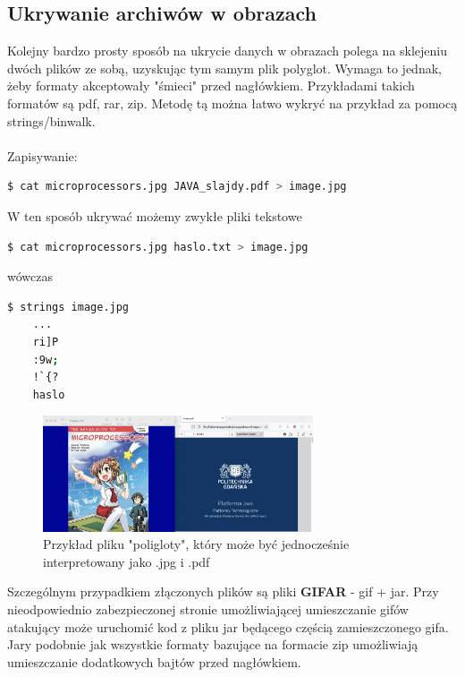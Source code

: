 \documentclass{article}
\begin{document}
\subsection{Ukrywanie archiwów w obrazach}
Kolejny bardzo prosty sposób na ukrycie danych w obrazach polega na sklejeniu dwóch plików ze sobą, uzyskując tym samym plik polyglot.  Wymaga to jednak, żeby formaty akceptowały "śmieci" przed nagłówkiem.  Przykładami takich
formatów są pdf, rar, zip.
Metodę tą można łatwo wykryć na przykład za pomocą strings/binwalk. \\\\
Zapisywanie:
\begin{lstlisting}[language=bash]
  $ cat microprocessors.jpg JAVA_slajdy.pdf > image.jpg
\end{lstlisting}
W ten sposób ukrywać możemy zwykłe pliki tekstowe
\begin{lstlisting}[language=bash]
  $ cat microprocessors.jpg haslo.txt > image.jpg
\end{lstlisting}
wówczas 
\begin{lstlisting}[language=bash]
 $ strings image.jpg
	...
 	ri]P
	:9w;
	!`{?
	haslo
\end{lstlisting}
\begin{figure}[H]
	\centering
	\includegraphics[width=8cm]{sklejanie}
	\caption{Przykład pliku "poligloty", który może być jednocześnie interpretowany jako .jpg i .pdf}
\end{figure}
Szczególnym przypadkiem złączonych plików są pliki \textbf{GIFAR} - gif + jar.  Przy nieodpowiednio zabezpieczonej stronie umożliwiającej umieszczanie gifów atakujący może uruchomić 
kod z pliku jar będącego częścią zamieszczonego gifa.  Jary podobnie jak wszystkie formaty bazujące na formacie zip umożliwiają umieszczanie dodatkowych bajtów przed nagłówkiem.
\end{document}
